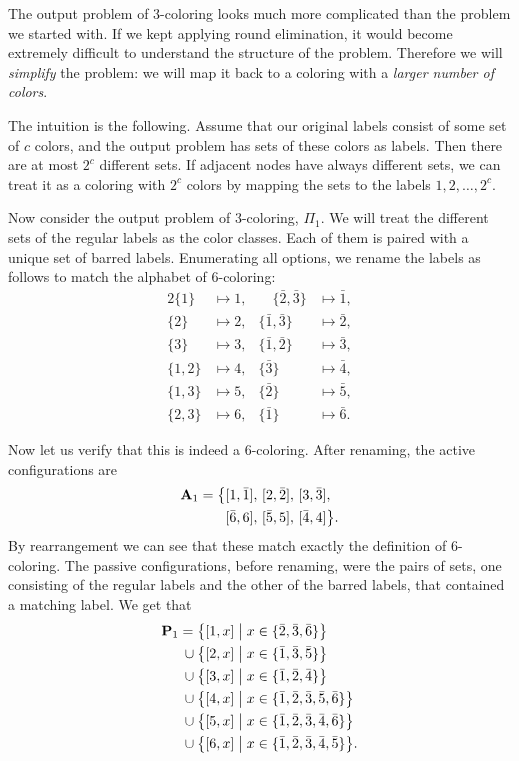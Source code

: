 The output problem of 3-coloring looks much more complicated than the problem we started with. If we kept applying round elimination, it would become extremely difficult to understand the structure of the problem. Therefore we will \emph{simplify} the problem: we will map it back to a coloring with a \emph{larger number of colors}.

The intuition is the following. Assume that our original labels consist of some set of $c$ colors, and the output problem has sets of these colors as labels. Then there are at most $2^c$ different sets. If adjacent nodes have always different sets, we can treat it as a coloring with $2^c$ colors by mapping the sets to the labels $1,2,\dots, 2^c$.

Now consider the output problem of 3-coloring, $\Pi_1$. We will treat the different sets of the regular labels as the color classes. Each of them is paired with a unique set of barred labels. Enumerating all options, we rename the labels as follows to match the alphabet of $6$-coloring:
\begingroup
\allowdisplaybreaks
\begin{alignat*}{2}
	\{ 1 \} &\mapsto 1, & \quad\{\bar{2},\bar{3} \} &\mapsto \bar{1}, \\
	\{ 2 \} &\mapsto 2, & \{\bar{1},\bar{3} \} &\mapsto \bar{2}, \\
	\{ 3 \} &\mapsto 3, & \{\bar{1},\bar{2} \} &\mapsto \bar{3}, \\
	\{ 1,2 \} &\mapsto 4, & \{\bar{3}\} &\mapsto \bar{4}, \\
	\{ 1,3 \} &\mapsto 5, & \{ \bar{2} \} &\mapsto \bar{5}, \\
	\{ 2,3 \} &\mapsto 6, & \{ \bar{1} \} &\mapsto \bar{6}.
\end{alignat*}
\endgroup

Now let us verify that this is indeed a 6-coloring. After renaming, the active configurations are
\begin{align*}
	\mathbf{A}_1 = \bigl\{& 
	[1,\bar{1}],\,
	[2,\bar{2}],\,
	[3,\bar{3}],\, \\
	&[\bar{6},6],\,
	[\bar{5},5],\,
	[\bar{4},4] 
	\bigr\}.
\end{align*}
By rearrangement we can see that these match exactly the definition of $6$-coloring. The passive configurations, before renaming, were the pairs of sets, one consisting of the regular labels and the other of the barred labels, that contained a matching label. We get that 
\begin{align*}
	\mathbf{P}_1
	      = {}&\bigl\{ [1, x] \bigm| x \in \{ \bar{2}, \bar{3}, \bar{6} \} \bigr\} \\
	{} \cup {}&\bigl\{ [2, x] \bigm| x \in \{ \bar{1}, \bar{3}, \bar{5} \} \bigr\} \\
	{} \cup {}&\bigl\{ [3, x] \bigm| x \in \{ \bar{1}, \bar{2}, \bar{4} \} \bigr\} \\
	{} \cup {}&\bigl\{ [4, x] \bigm| x \in \{ \bar{1}, \bar{2}, \bar{3}, \bar{5}, \bar{6} \} \bigr\} \\
	{} \cup {}&\bigl\{ [5, x] \bigm| x \in \{ \bar{1}, \bar{2}, \bar{3}, \bar{4}, \bar{6} \} \bigr\} \\
	{} \cup {}&\bigl\{ [6, x] \bigm| x \in \{ \bar{1}, \bar{2}, \bar{3}, \bar{4}, \bar{5} \} \bigr\}.
\end{align*}


